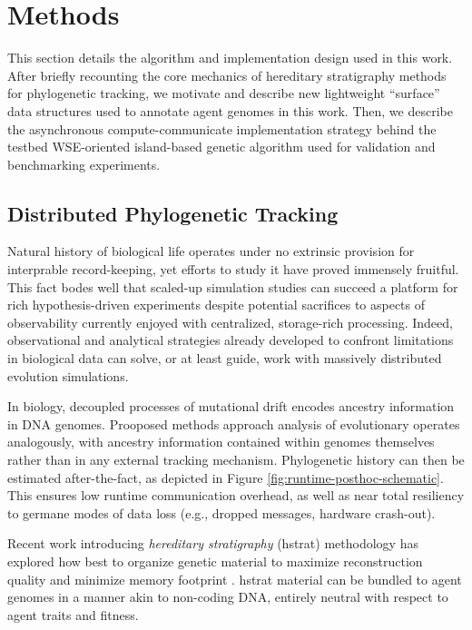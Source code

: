 \section{Methods} \label{sec:methods}

This section details the algorithm and implementation design used in this work.
After briefly recounting the core mechanics of hereditary stratigraphy methods for phylogenetic tracking, we motivate and describe new lightweight ``surface'' data structures used to annotate agent genomes in this work.
Then, we describe the asynchronous compute-communicate implementation strategy behind the testbed WSE-oriented island-based genetic algorithm used for validation and benchmarking experiments.



\subsection{Distributed Phylogenetic Tracking}

Natural history of biological life operates under no extrinsic provision for interprable record-keeping, yet efforts to study it have proved immensely fruitful.
This fact bodes well that scaled-up simulation studies can succeed a platform for rich hypothesis-driven experiments despite potential sacrifices to aspects of observability currently enjoyed with centralized, storage-rich processing.
Indeed, observational and analytical strategies already developed to confront limitations in biological data can solve, or at least guide, work with massively distributed evolution simulations.

In biology, decoupled processes of mutational drift encodes ancestry information in DNA genomes.
Prooposed methods approach analysis of evolutionary operates analogously, with ancestry information contained within genomes themselves rather than in any external tracking mechanism.
Phylogenetic history can then be estimated after-the-fact, as depicted in Figure \ref{fig:runtime-posthoc-schematic}.
This ensures low runtime communication overhead, as well as near total resiliency to germane modes of data loss (e.g., dropped messages, hardware crash-out).

Recent work introducing \textit{hereditary stratigraphy} (hstrat) methodology has explored how best to organize genetic material to maximize reconstruction quality and minimize memory footprint \citep{moreno2022hstrat, moreno2022hereditary}.
hstrat material can be bundled to agent genomes in a manner akin to non-coding DNA, entirely neutral with respect to agent traits and fitness.

